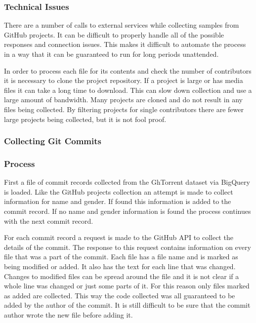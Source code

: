 \documentclass{article}
\begin{document}
\subsubsection*{Technical Issues}
There are a number of calls to external services while collecting samples from GitHub projects. It can be difficult to properly handle all of the possible responses and connection issues. This makes it difficult to automate the process in a way that it can be guaranteed to run for long periods unattended.

In order to process each file for its contents and check the number of contributors it is necessary to clone the project repository. If a project is large or has media files it can take a long time to download. This can slow down collection and use a large amount of bandwidth. Many projects are cloned and do not result in any files being collected. By filtering projects for single contributors there are fewer large projects being collected, but it is not fool proof.


\subsubsection{Collecting Git Commits}

\subsubsection*{Process}
First a file of commit records collected from the GhTorrent dataset via BigQuery is loaded. Like the GitHub projects collection an attempt is made to collect information for name and gender. If found this information is added to the commit record. If no name and gender information is found the process continues with the next commit record.

For each commit record a request is made to the GitHub API to collect the details of the commit. The response to this request contains information on every file that was a part of the commit. Each file has a file name and is marked as being modified or added. It also has the text for each line that was changed. Changes to modified files can be spread around the file and it is not clear if a whole line was changed or just some parts of it. For this reason only files marked as added are collected. This way the code collected was all guaranteed to be added by the author of the commit. It is still difficult to be sure that the commit author wrote the new file before adding it.
\end{document}
